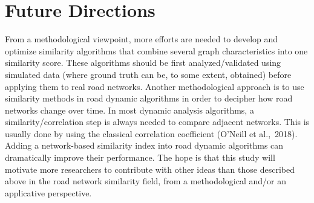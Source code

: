 \section{Future Directions}
From a methodological viewpoint, more efforts are needed to develop and optimize similarity algorithms that combine several graph characteristics into one similarity score. These algorithms should be first analyzed/validated using simulated data (where ground truth can be, to some extent, obtained) before applying them to real road networks. Another methodological approach is to use similarity methods in road dynamic algorithms in order to decipher how road networks change over time. In most dynamic analysis algorithms, a similarity/correlation step is always needed to compare adjacent networks. This is usually done by using the classical correlation coefficient (O’Neill et al., 2018). Adding a network-based similarity index into road dynamic algorithms can dramatically improve their performance.
The hope is that this study will motivate more researchers to contribute with other ideas than those described above in the road network similarity field, from a methodological and/or an applicative perspective.